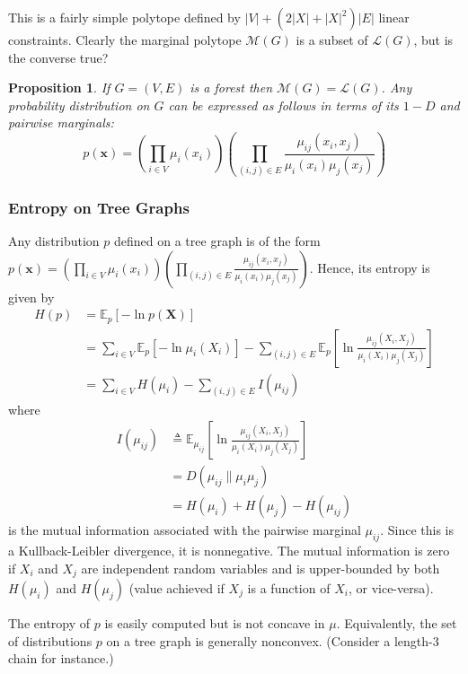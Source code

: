 \documentclass[11pt,a4paper]{article}
\newtheorem{proposition}{Proposition}
\begin{document}
This is a fairly simple polytope defined by $|V|+\left(2|X|+|X|^2\right)|E|$ linear constraints. Clearly the marginal polytope $\mathcal{M}(G)$ is a subset of $\mathcal{L}(G)$, but is the converse true?

\begin{proposition}
    If $G=(V,E)$ is a forest then $\mathcal{M}(G)=\mathcal{L}(G)$. Any probability distribution on $G$ can be expressed as follows in terms of its $1-D$ and pairwise marginals:
    $$
    p(\boldsymbol{x})=\left(\prod_{i \in V} \mu_i\left(x_i\right)\right)\left(\prod_{(i, j) \in E} \frac{\mu_{i j}\left(x_i, x_j\right)}{\mu_i\left(x_i\right) \mu_j\left(x_j\right)}\right)
    $$
\end{proposition}


\subsubsection{Entropy on Tree Graphs}
Any distribution $p$ defined on a tree graph is of the form $p(\boldsymbol{x})=\left(\prod_{i \in V} \mu_i\left(x_i\right)\right)\left(\prod_{(i, j) \in E} \frac{\mu_{i j}\left(x_i, x_j\right)}{\mu_i\left(x_i\right) \mu_j\left(x_j\right)}\right)$. Hence, its entropy is given by
$$
\begin{aligned}
H(p) &=\mathbb{E}_p[-\ln p(\boldsymbol{X})] \\
&=\sum_{i \in V} \mathbb{E}_p\left[-\ln \mu_i\left(X_i\right)\right]-\sum_{(i, j) \in E} \mathbb{E}_p\left[\ln \frac{\mu_{i j}\left(X_i, X_j\right)}{\mu_i\left(X_i\right) \mu_j\left(X_j\right)}\right] \\
&=\sum_{i \in V} H\left(\mu_i\right)-\sum_{(i, j) \in E} I\left(\mu_{i j}\right)
\end{aligned}
$$
where
$$
\begin{aligned}
I\left(\mu_{i j}\right) & \triangleq \mathbb{E}_{\mu_{i j}}\left[\ln \frac{\mu_{i j}\left(X_i, X_j\right)}{\mu_i\left(X_i\right) \mu_j\left(X_j\right)}\right] \\
&=D\left(\mu_{i j} \| \mu_i \mu_j\right) \\
&=H\left(\mu_i\right)+H\left(\mu_j\right)-H\left(\mu_{i j}\right)
\end{aligned}
$$
is the mutual information associated with the pairwise marginal $\mu_{i j}$. Since this is a Kullback-Leibler divergence, it is nonnegative. The mutual information is zero if $X_i$ and $X_j$ are independent random variables and is upper-bounded by both $H\left(\mu_i\right)$ and $H\left(\mu_j\right)$ (value achieved if $X_j$ is a function of $X_i$, or vice-versa).

The entropy of $p$ is easily computed but is not concave in $\mu$. Equivalently, the set of distributions $p$ on a tree graph is generally nonconvex. (Consider a length-3 chain for instance.)
\end{document}
